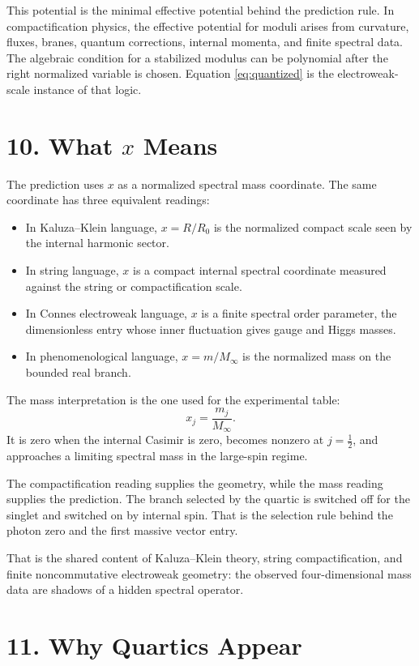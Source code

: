 \documentclass[11pt]{article}
\begin{document}
This potential is the minimal effective potential behind the prediction rule. In compactification physics, the effective potential for moduli arises from curvature, fluxes, branes, quantum corrections, internal momenta, and finite spectral data. The algebraic condition for a stabilized modulus can be polynomial after the right normalized variable is chosen. Equation \eqref{eq:quantized} is the electroweak-scale instance of that logic.


\section*{10. What \(x\) Means}

The prediction uses \(x\) as a normalized spectral mass coordinate. The same coordinate has three equivalent readings:

\begin{itemize}
\item In Kaluza--Klein language, \(x=R/R_0\) is the normalized compact scale seen by the internal harmonic sector.
\item In string language, \(x\) is a compact internal spectral coordinate measured against the string or compactification scale.
\item In Connes electroweak language, \(x\) is a finite spectral order parameter, the dimensionless entry whose inner fluctuation gives gauge and Higgs masses.
\item In phenomenological language, \(x=m/M_\infty\) is the normalized mass on the bounded real branch.
\end{itemize}

The mass interpretation is the one used for the experimental table:
\[
        x_j=\frac{m_j}{M_\infty}.
\]
It is zero when the internal Casimir is zero, becomes nonzero at \(j=\frac12\), and approaches a limiting spectral mass in the large-spin regime.

The compactification reading supplies the geometry, while the mass reading supplies the prediction. The branch selected by the quartic is switched off for the singlet and switched on by internal spin. That is the selection rule behind the photon zero and the first massive vector entry.

That is the shared content of Kaluza--Klein theory, string compactification, and finite noncommutative electroweak geometry: the observed four-dimensional mass data are shadows of a hidden spectral operator.


\section*{11. Why Quartics Appear}
\end{document}
